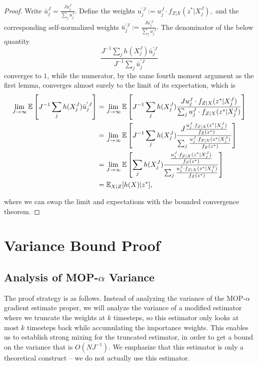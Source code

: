 \documentclass{article}
\begin{document}
\begin{proof}
    Write $\bar{u}_j^{J} = \frac{J u_j^J}{\sum_j u_j^J}$. Define the weights $u^{' J}_j := u_j^J \cdot f_{Z|X}(z^*|X_j^J),$ and the corresponding self-normalized weights $\bar{u}_j^{' J} := \frac{J u^{' J}_j}{\sum_j u^{' J}_j}.$ The denominator of the below quantity 
    $$ \frac{J^{-1} \sum_j h(X_j^J) \bar{u}_j^{' J}}{J^{-1} \sum_j \bar{u}_j^{' J}}$$
    converges to $1$, while the numerator, by the same fourth moment argument as the first lemma, converges almost surely to the limit of its expectation, which is
    \begin{align*}
        \lim_{J\to\infty} \mathbb{E}\left[J^{-1} \sum_j h(X_j^J) \bar{u}_j^{' J} \right]
        &= \lim_{J\to\infty} \mathbb{E}\left[J^{-1} \sum_j h(X_j^J) \frac{J u_j^J \cdot f_{Z|X}(z^*|X_j^J)}{\sum_j u_j^J \cdot f_{Z|X}(z^*|X_j^J)}\right] \\
        &= \lim_{J\to\infty} \mathbb{E}\left[J^{-1} \sum_j h(X_j^J) \frac{J \frac{u_j^J \cdot f_{Z|X}(z^*|X_j^J)}{f_Z(z^*)}}{\sum_j \frac{u_j^J \cdot f_{Z|X}(z^*|X_j^J)}{f_Z(z^*)}}\right]\\
        &= \lim_{J\to\infty} \mathbb{E}\left[ \sum_j h(X_j^J) \frac{\frac{u_j^J \cdot f_{Z|X}(z^*|X_j^J)}{f_Z(z^*)}}{\sum_j \frac{u_j^J \cdot f_{Z|X}(z^*|X_j^J)}{f_Z(z^*)}}\right]\\
        &= \mathbb{E}_{X|Z}[h(X)|z^*],
    \end{align*}

    where we can swap the limit and expectations with the bounded convergence theorem.
\end{proof}

\section{Variance Bound Proof}
\label{app:variance}

\subsection{Analysis of MOP-$\alpha$ Variance}

The proof strategy is as follows. Instead of analyzing the variance of the MOP-$\alpha$ gradient estimate proper, we will analyze the variance of a modified estimator where we truncate the weights at $k$ timesteps, so this estimator only looks at most $k$ timesteps back while accumulating the importance weights. This enables us to establish strong mixing for the truncated estimator, in order to get a bound on the variance that is $O(NJ^{-1})$. We emphasize that this estimator is only a theoretical construct -- we do not actually use this estimator. 
\end{document}
